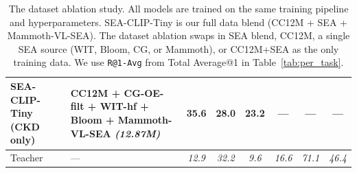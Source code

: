 \begin{table}[h!]
{\begin{tabular}{l l c c c c c c}
SEA-CLIP-Tiny (CKD only)
  & CC12M + CG-OE-filt + WIT-hf + Bloom + Mammoth-VL-SEA \textit{(12.87M)}
  & 35.6 & 28.0 & 23.2 & --- & --- & --- \\
\midrule
Teacher
  & ---
  & \textit{12.9} & \textit{32.2} & \textit{9.6} & \textit{16.6} & \textit{71.1} & \textit{46.4} \\
\bottomrule
\end{tabular}%
}
\caption{The dataset ablation study. All models are trained on the same training pipeline and hyperparameters. SEA-CLIP-Tiny is our full data blend (CC12M + SEA + Mammoth-VL-SEA). The dataset ablation swaps in SEA blend, CC12M, a single SEA source (WIT, Bloom, CG, or Mammoth), or CC12M+SEA as the only training data. We use \texttt{R@1-Avg} from Total Average@1 in Table~\ref{tab:per_task}.}
\label{tab:training}
\vspace{-8mm}
\end{table}
